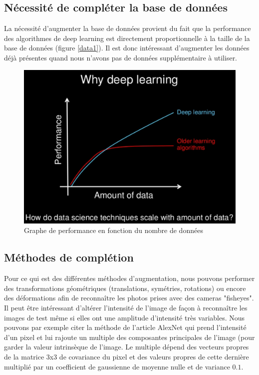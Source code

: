 \documentclass[a4paper,11pt]{article}
\begin{document}
    \subsection{Nécessité de compléter la base de données}

	La nécessité d'augmenter la base de données provient du fait que la performance des
	algorithmes de deep learning est directement proportionnelle à la taille de la base de
	données (figure \ref{data1}). Il est donc intéressant d'augmenter les données déjà présentes
	quand nous n'avons pas de données supplémentaire à utiliser.

	\begin{figure}[H]
	    \centering
	    \includegraphics[scale=0.3]{deeplearning_data.png}
	    \caption{Graphe de performance en fonction du nombre de données}
	    \label{fig:data1}
	\end{figure}

    \subsection{Méthodes de complétion}

	Pour ce qui est des différentes méthodes d'augmentation, nous pouvons performer des
	transformations géométriques (translations, symétries, rotations) ou encore des
	déformations afin de reconnaître les photos prises avec des cameras "fisheyes".\\

	Il peut être intéressant d'altérer l'intensité de l'image de façon à reconnaître les images
	de test même si elles ont une amplitude d'intensité très variables. Nous pouvons par exemple
	citer la méthode de l'article AlexNet \cite{alexnet} qui prend l'intensité d'un pixel et lui
	rajoute un multiple des composantes principales de l'image (pour garder la valeur
	intrinsèque de l'image. Le multiple dépend des vecteurs propres de la matrice 3x3 de
	covariance du pixel et des valeurs propres de cette dernière multiplié par un coefficient
	de gaussienne de moyenne nulle et de variance $0.1$.\\
\end{document}
